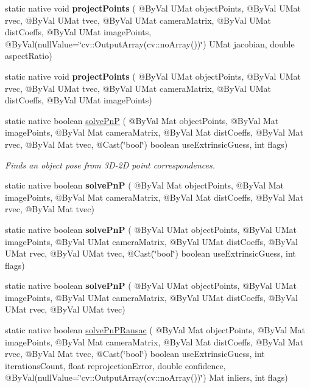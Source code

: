 \begin{DoxyCompactItemize}
static native void {\bfseries project\+Points} ( @By\+Val U\+Mat object\+Points, @By\+Val U\+Mat rvec, @By\+Val U\+Mat tvec, @By\+Val U\+Mat camera\+Matrix, @By\+Val U\+Mat dist\+Coeffs, @By\+Val U\+Mat image\+Points, @By\+Val(null\+Value=\char`\"{}cv\+::\+Output\+Array(cv\+::no\+Array())\char`\"{}) U\+Mat jacobian, double aspect\+Ratio)
\item 
static native void {\bfseries project\+Points} ( @By\+Val U\+Mat object\+Points, @By\+Val U\+Mat rvec, @By\+Val U\+Mat tvec, @By\+Val U\+Mat camera\+Matrix, @By\+Val U\+Mat dist\+Coeffs, @By\+Val U\+Mat image\+Points)
\item 
static native boolean \hyperlink{group__calib3d_ga4ed4dcff68153a9ec5eb087c0ee29913}{solve\+PnP} ( @By\+Val Mat object\+Points, @By\+Val Mat image\+Points, @By\+Val Mat camera\+Matrix, @By\+Val Mat dist\+Coeffs, @By\+Val Mat rvec, @By\+Val Mat tvec, @Cast(\char`\"{}bool\char`\"{}) boolean use\+Extrinsic\+Guess, int flags)
\begin{DoxyCompactList}\small\item\em Finds an object pose from 3\+D-\/2D point correspondences. \end{DoxyCompactList}\item 
static native boolean {\bfseries solve\+PnP} ( @By\+Val Mat object\+Points, @By\+Val Mat image\+Points, @By\+Val Mat camera\+Matrix, @By\+Val Mat dist\+Coeffs, @By\+Val Mat rvec, @By\+Val Mat tvec)
\item 
static native boolean {\bfseries solve\+PnP} ( @By\+Val U\+Mat object\+Points, @By\+Val U\+Mat image\+Points, @By\+Val U\+Mat camera\+Matrix, @By\+Val U\+Mat dist\+Coeffs, @By\+Val U\+Mat rvec, @By\+Val U\+Mat tvec, @Cast(\char`\"{}bool\char`\"{}) boolean use\+Extrinsic\+Guess, int flags)
\item 
static native boolean {\bfseries solve\+PnP} ( @By\+Val U\+Mat object\+Points, @By\+Val U\+Mat image\+Points, @By\+Val U\+Mat camera\+Matrix, @By\+Val U\+Mat dist\+Coeffs, @By\+Val U\+Mat rvec, @By\+Val U\+Mat tvec)
\item 
static native boolean \hyperlink{group__calib3d_ga87d56bc65d398f58897fa9bda35caef7}{solve\+Pn\+P\+Ransac} ( @By\+Val Mat object\+Points, @By\+Val Mat image\+Points, @By\+Val Mat camera\+Matrix, @By\+Val Mat dist\+Coeffs, @By\+Val Mat rvec, @By\+Val Mat tvec, @Cast(\char`\"{}bool\char`\"{}) boolean use\+Extrinsic\+Guess, int iterations\+Count, float reprojection\+Error, double confidence, @By\+Val(null\+Value=\char`\"{}cv\+::\+Output\+Array(cv\+::no\+Array())\char`\"{}) Mat inliers, int flags)

\end{DoxyCompactItemize}
